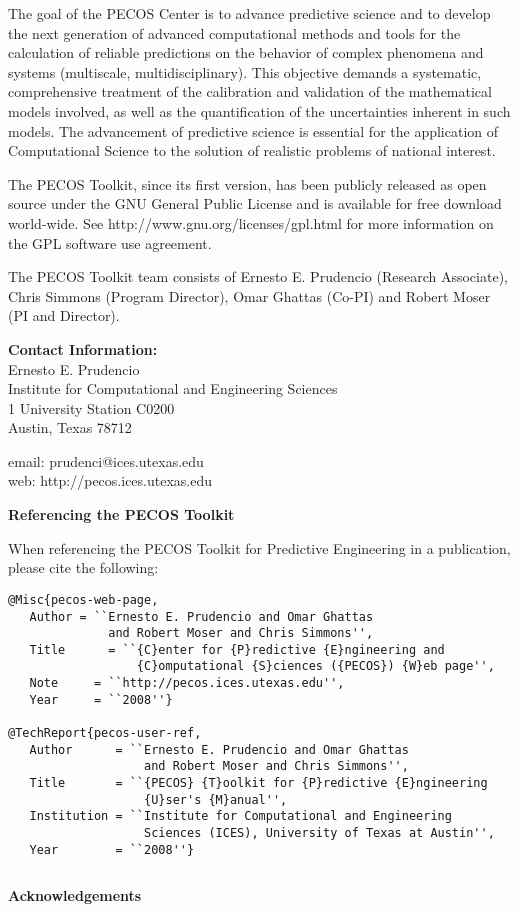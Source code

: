 The goal of the PECOS Center is
to advance predictive science and to develop the next generation of advanced computational methods and tools
for the calculation of reliable predictions on the behavior of complex phenomena and systems (multiscale, multidisciplinary).
This objective demands a systematic, comprehensive treatment of the calibration and validation of the mathematical models involved,
as well as the quantification of the uncertainties inherent in such models.
The advancement of predictive science is essential for the application of Computational Science to the solution of realistic problems of national interest.

The PECOS Toolkit, since its first version, has been publicly released as open source
under the GNU General Public License and is available for free download world-wide.
See http://www.gnu.org/licenses/gpl.html for more information on the GPL software use agreement.

The PECOS Toolkit team consists of
Ernesto E. Prudencio (Research Associate),
Chris Simmons (Program Director),
Omar Ghattas (Co-PI) and
Robert Moser (PI and Director).

{\bf Contact Information:}\\
Ernesto E. Prudencio\\
Institute for Computational and Engineering Sciences\\
1 University Station C0200\\
Austin, Texas 78712

email: prudenci@ices.utexas.edu\\
web: http://pecos.ices.utexas.edu\\
$~$\\

\centerline{\bf Referencing the PECOS Toolkit}

When referencing the PECOS Toolkit for Predictive Engineering in a publication, please cite the following:
\begin{verbatim}
@Misc{pecos-web-page,
   Author = ``Ernesto E. Prudencio and Omar Ghattas
              and Robert Moser and Chris Simmons'',
   Title      = ``{C}enter for {P}redictive {E}ngineering and
                  {C}omputational {S}ciences ({PECOS}) {W}eb page'',
   Note     = ``http://pecos.ices.utexas.edu'',
   Year     = ``2008''}

@TechReport{pecos-user-ref,
   Author      = ``Ernesto E. Prudencio and Omar Ghattas
                   and Robert Moser and Chris Simmons'',
   Title       = ``{PECOS} {T}oolkit for {P}redictive {E}ngineering
                   {U}ser's {M}anual'',
   Institution = ``Institute for Computational and Engineering
                   Sciences (ICES), University of Texas at Austin'',
   Year        = ``2008''}
\end{verbatim}
$~$\\
$~$\\

\centerline{\bf Acknowledgements}


